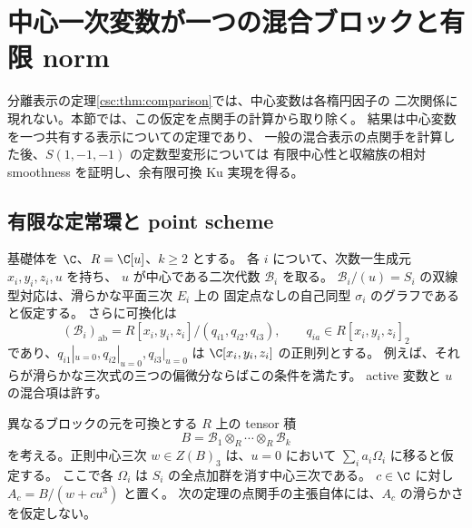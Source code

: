 \section{中心一次変数が一つの混合ブロックと有限 norm}
\label{cmo:sec:points}

分離表示の定理\ref{csc:thm:comparison}では、中心変数は各楕円因子の
二次関係に現れない。本節では、この仮定を点関手の計算から取り除く。
結果は中心変数を一つ共有する表示についての定理であり、
一般の混合表示の点関手を計算した後、$S(1,-1,-1)$ の定数型変形については
有限中心性と収縮族の相対 smoothness を証明し、余有限可換 Ku 実現を得る。

\subsection{有限な定常環と point scheme}

基礎体を $\C$、$R=\C[u]$、$k\geq2$ とする。
各 $i$ について、次数一生成元 $x_i,y_i,z_i,u$ を持ち、
$u$ が中心である二次代数 $\mathcal B_i$ を取る。
$\mathcal B_i/(u)=S_i$ の双線型対応は、滑らかな平面三次 $E_i$ 上の
固定点なしの自己同型 $\sigma_i$ のグラフであると仮定する。
さらに可換化は
\begin{equation}\label{cmo:eq:abelian}
 (\mathcal B_i)_{\mathrm{ab}}
   =R[x_i,y_i,z_i]/(q_{i1},q_{i2},q_{i3}),\qquad
 q_{ia}\in R[x_i,y_i,z_i]_2
\end{equation}
であり、$q_{i1}|_{u=0},q_{i2}|_{u=0},q_{i3}|_{u=0}$ は
$\C[x_i,y_i,z_i]$ の正則列とする。
例えば、それらが滑らかな三次式の三つの偏微分ならばこの条件を満たす。
active 変数と $u$ の混合項は許す。

異なるブロックの元を可換とする $R$ 上の tensor 積
\[
 B=\mathcal B_1\otimes_R\cdots\otimes_R\mathcal B_k
\]
を考える。正則中心三次 $w\in Z(B)_3$ は、$u=0$ において
$\sum_i a_i\Omega_i$ に移ると仮定する。
ここで各 $\Omega_i$ は $S_i$ の全点加群を消す中心三次である。
$c\in\C$ に対し $A_c=B/(w+cu^3)$ と置く。
次の定理の点関手の主張自体には、$A_c$ の滑らかさを仮定しない。

